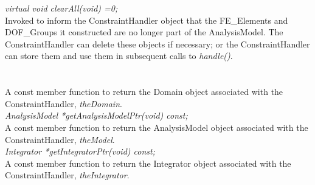 {\em virtual void clearAll(void) =0;} \\
Invoked to inform the ConstraintHandler object that the FE\_Elements
and DOF\_Groups it constructed are no longer part of the AnalysisModel. The
ConstraintHandler can delete these objects if necessary; or the
ConstraintHandler can store them and use them in subsequent calls to
{\em handle()}. \\ 

  \\
 \\
A const member function to return the Domain object associated with
the ConstraintHandler, {\em theDomain}. \\

{\em AnalysisModel *getAnalysisModelPtr(void) const;} \\
A const member function to return the AnalysisModel object associated with
the ConstraintHandler, {\em theModel}. \\

{\em Integrator *getIntegratorPtr(void) const;} \\
A const member function to return the Integrator object associated with
the ConstraintHandler, {\em theIntegrator}. 






